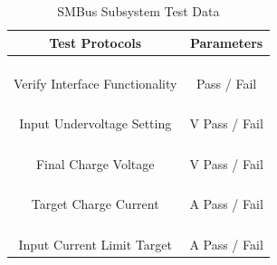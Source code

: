 \documentclass[12pt]{article}
\begin{document}
\begin{table}[h!]
\centering
\caption*{SMBus Subsystem Test Data}
\begin{tabular}{ | c | c | }
\hline
\textbf{Test Protocols} & \textbf{Parameters} \\
\hline
\parbox{0.5\linewidth}{\raggedright \hfill \\[-0.25 em]
Verify Interface Functionality
\hfill \\[0.1 em]} &  \parbox{0.4\linewidth}{\centering \hfill \\ [0.7 em] 
Pass \space / \space  Fail \hfill \\ [0.3 em]} \\ 
\hline
\parbox{0.5\linewidth}{\raggedright \hfill \\[-0.25 em]
Input Undervoltage Setting
\hfill \\[0.1 em]} &  \parbox{0.4\linewidth}{\raggedright \hfill \\ [0.7 em]\underline{\hspace{0.625in}} 
V  
\hspace{0.125 in}Pass \space / \space  Fail \hfill \\ [0.3 em]} \\ 
\hline
\parbox{0.5\linewidth}{\raggedright \hfill \\[-0.25 em]
Final Charge Voltage
\hfill \\[0.1 em]} &  \parbox{0.4\linewidth}{\raggedright \hfill \\ [0.7 em]\underline{\hspace{0.625in}} 
V
\hspace{0.125 in}Pass \space / \space  Fail \hfill \\ [0.3 em]} \\ 
\hline
\parbox{0.5\linewidth}{\raggedright \hfill \\[-0.25 em]
Target Charge Current
\hfill \\[0.1 em]} &  \parbox{0.4\linewidth}{\raggedright \hfill \\ [0.7 em]\underline{\hspace{0.625in}} 
A
\hspace{0.125 in}Pass \space / \space  Fail \hfill \\ [0.3 em]} \\ 
\hline
\parbox{0.5\linewidth}{\raggedright \hfill \\[-0.25 em]
Input Current Limit Target
\hfill \\[0.1 em]} &  \parbox{0.4\linewidth}{\raggedright \hfill \\ [0.7 em]\underline{\hspace{0.625in}} 
A
\hspace{0.125 in}Pass \space / \space  Fail \hfill \\ [0.3 em]} \\ 
\hline
\end{tabular}
\end{table}
\end{document}

